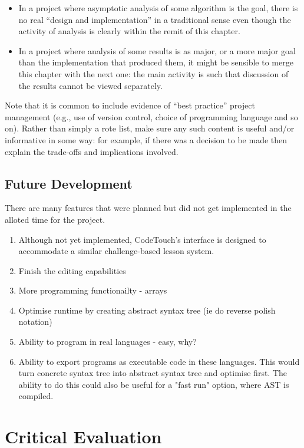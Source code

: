 \documentclass[ %
                    author={Jonathan Rankin},
                supervisor={Dr. David May, Dr. Ian Holyer},
                    degree={MEng},
                     title={CodeTouch},
                  subtitle={A Revolutionary Way To Program Real Code On Touch Screen Devices},
                      type={enterprise},
                      year={2015 } ]{dissertation}
\begin{document}
\begin{itemize}
\item In a project where asymptotic analysis of some algorithm is the goal,
      there is no real ``design and implementation'' in a traditional sense
      even though the activity of analysis is clearly within the remit of
      this chapter.
\item In a project where analysis of some results is as major, or a more
      major goal than the implementation that produced them, it might be
      sensible to merge this chapter with the next one: the main activity 
      is such that discussion of the results cannot be viewed separately.
\end{itemize}

\noindent
Note that it is common to include evidence of ``best practice'' project 
management (e.g., use of version control, choice of programming language 
and so on).  Rather than simply a rote list, make sure any such content 
is useful and/or informative in some way: for example, if there was a 
decision to be made then explain the trade-offs and implications 
involved.

\section{Future Development}
There are many features that were planned but did not get implemented in the alloted time for the project. 
\begin{enumerate}
\item Although not yet implemented, CodeTouch's interface is designed to accommodate a similar challenge-based lesson system.
\item Finish the editing capabilities
\item More programming functionailty - arrays 
\item Optimise runtime by creating abstract syntax tree (ie do reverse polish notation)
\item Ability to program in real languages - easy, why?
\item Ability to export programs as executable code in these languages. This would turn concrete syntax tree into abstract syntax tree and optimise first. The ability to do this could also be useful for a "fast run" option, where AST is compiled. 
\end{enumerate}



\chapter{Critical Evaluation}
\label{chap:evaluation}
\end{document}
